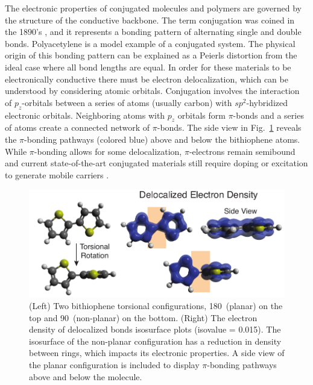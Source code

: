 The electronic properties of conjugated molecules and polymers are governed by the structure of the conductive backbone. The term conjugation was coined in the 1890’s \cite{Thiele1899}, and it represents a bonding pattern of alternating single and double bonds. Polyacetylene is a model example of a conjugated system. The physical origin of this bonding pattern can be explained as a Peierls distortion \cite{Roth2013} from the ideal case where all bond lengths are equal. In order for these materials to be electronically conductive there must be electron delocalization, which can be understood by considering atomic orbitals. Conjugation involves the interaction of $p_z$-orbitals between a series of atoms (usually carbon) with $sp^2$-hybridized electronic orbitals. Neighboring atoms with $p_z$ orbitals form $\pi$-bonds and a series of atoms create a connected network of $\pi$-bonds. The side view in Fig.~\ref{fig:eddb} reveals the $\pi$-bonding pathways (colored blue) above and below the bithiophene atoms. While $\pi$-bonding allows for some delocalization, $\pi$-electrons remain semibound and current state-of-the-art conjugated materials still require doping or excitation to generate mobile carriers \cite{Nobel2000}.

\begin{figure}[hbt!]
  \includegraphics{figures/chap1_intro/figure_delocal_copy.pdf}
  \caption[Electron Density of Delocalized Bonds]{(Left) Two bithiophene torsional configurations, 180\textdegree \ (planar) on the top and 90\textdegree \ (non-planar) on the bottom. (Right) The electron density of delocalized bonds \cite{Szczepanik2017} isosurface plots (isovalue = 0.015). The isosurface of the non-planar configuration has a reduction in density between rings, which impacts its electronic properties. A side view of the planar configuration is included to display $\pi$-bonding pathways above and below the molecule.}
  \label{fig:eddb}
\end{figure}

